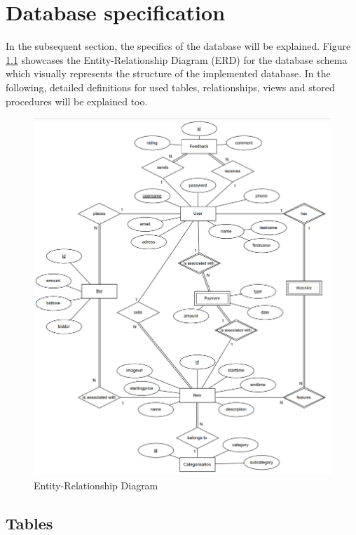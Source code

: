 \chapter{Database specification}

In the subsequent section, the specifics of the database will be explained. Figure \ref{fig:erd} showcases the Entity-Relationship Diagram (ERD) for the database schema which visually represents the structure of the implemented database. In the following, detailed definitions for used tables, relationships, views and stored procedures will be explained too.

\begin{figure}[htbp]
	\centering
	\includegraphics[height=0.65\textheight]{img/erd.png}
	\caption{Entity-Relationship Diagram}
	\label{fig:erd}
\end{figure}

\section{Tables}

